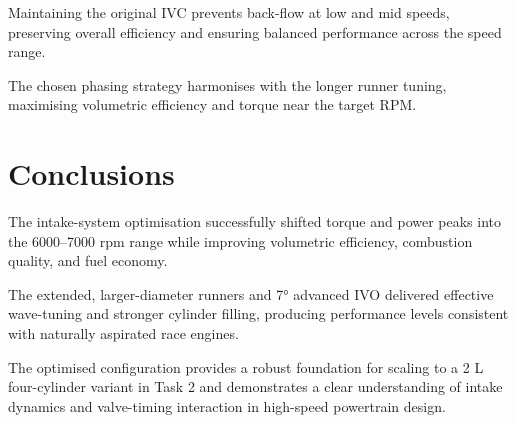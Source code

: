 Maintaining the original IVC prevents back-flow at low and mid speeds, preserving overall efficiency and ensuring balanced performance across the speed range.

The chosen phasing strategy harmonises with the longer runner tuning, maximising volumetric efficiency and torque near the target RPM.



\section{Conclusions}

The intake-system optimisation successfully shifted torque and power peaks into the 6000--7000 rpm range while improving volumetric efficiency, combustion quality, and fuel economy.

The extended, larger-diameter runners and 7° advanced IVO delivered effective wave-tuning and stronger cylinder filling, producing performance levels consistent with naturally aspirated race engines.

The optimised configuration provides a robust foundation for scaling to a 2 L four-cylinder variant in Task 2 and demonstrates a clear understanding of intake dynamics and valve-timing interaction in high-speed powertrain design.
